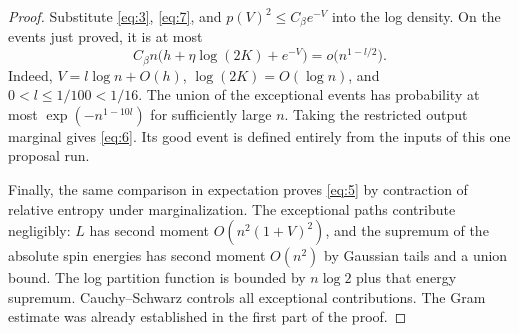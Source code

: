 \begin{proof}
Substitute \eqref{eq:3}, \eqref{eq:7}, and
$p(V)^2\le C_\beta e^{-V}$ into the log density. On the events just
proved, it is at most
\[
 C_\beta n\bigl(h+\eta\log(2K)+e^{-V}\bigr)
 =o\bigl(n^{1-l/2}\bigr).
\]
Indeed, $V=l\log n+O(h)$, $\log(2K)=O(\log n)$, and
$0<l\le1/100<1/16$. The union of the exceptional events has
probability at most $\exp(-n^{1-10l})$ for sufficiently large $n$.
Taking the restricted output marginal gives
\eqref{eq:6}. Its good event is defined entirely from the inputs of
this one proposal run.

Finally, the same comparison in expectation proves \eqref{eq:5}
by contraction of relative entropy under marginalization. The
exceptional paths contribute negligibly: $L$ has second moment
$O(n^2(1+V)^2)$, and the supremum of the absolute spin energies has
second moment $O(n^2)$ by Gaussian tails and a union bound. The log
partition function is bounded by $n\log2$ plus that energy supremum.
Cauchy--Schwarz controls all exceptional contributions. The Gram
estimate was already established in the first part of the proof.
\end{proof}
